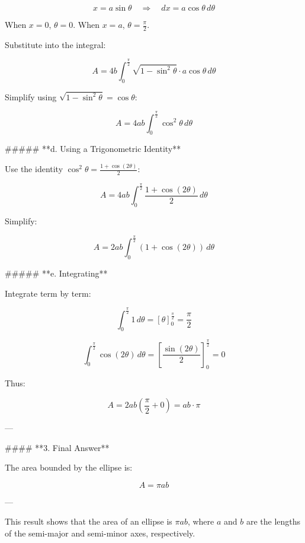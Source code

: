 \[
x = a \sin \theta \quad \Rightarrow \quad dx = a \cos \theta \, d\theta
\]

When \( x = 0 \), \( \theta = 0 \). When \( x = a \), \( \theta = \frac{\pi}{2} \).

Substitute into the integral:

\[
A = 4b \int_{0}^{\frac{\pi}{2}} \sqrt{1 - \sin^2 \theta} \cdot a \cos \theta \, d\theta
\]

Simplify using \( \sqrt{1 - \sin^2 \theta} = \cos \theta \):

\[
A = 4ab \int_{0}^{\frac{\pi}{2}} \cos^2 \theta \, d\theta
\]

##### **d. Using a Trigonometric Identity**

Use the identity \( \cos^2 \theta = \frac{1 + \cos(2\theta)}{2} \):

\[
A = 4ab \int_{0}^{\frac{\pi}{2}} \frac{1 + \cos(2\theta)}{2} \, d\theta
\]

Simplify:

\[
A = 2ab \int_{0}^{\frac{\pi}{2}} (1 + \cos(2\theta)) \, d\theta
\]

##### **e. Integrating**

Integrate term by term:

\[
\int_{0}^{\frac{\pi}{2}} 1 \, d\theta = \left[ \theta \right]_0^{\frac{\pi}{2}} = \frac{\pi}{2}
\]

\[
\int_{0}^{\frac{\pi}{2}} \cos(2\theta) \, d\theta = \left[ \frac{\sin(2\theta)}{2} \right]_0^{\frac{\pi}{2}} = 0
\]

Thus:

\[
A = 2ab \left( \frac{\pi}{2} + 0 \right) = ab \cdot \pi
\]

---

#### **3. Final Answer**

The area bounded by the ellipse is:

\[
A = \boxed{\pi a b}
\]

---

This result shows that the area of an ellipse is \( \pi a b \), where \( a \) and \( b \) are the lengths of the semi-major and semi-minor axes, respectively.
